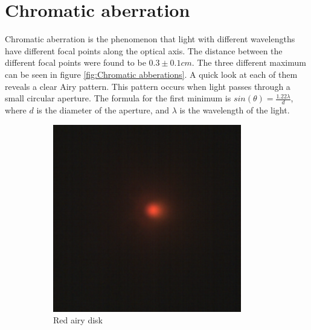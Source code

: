 \documentclass[a4paper,12pt]{article}
\begin{document}
\section{Chromatic aberration}
Chromatic aberration is the phenomenon that light with different wavelengths have different focal points along the optical axis.
The distance between the different focal points were found to be $0.3 \pm 0.1 cm$. The three different maximum can be seen in figure \ref{fig:Chromatic abberations}. A quick look at each of them reveals a clear Airy pattern. This pattern occurs when light passes through a small circular aperture. The formula for the first minimum is $sin(\theta) = \frac{1.22\lambda}{d}$, where $d$ is the diameter of the aperture, and $\lambda$ is the wavelength of the light. 
\begin{figure}[H]
        \centering
        \begin{subfigure}{0.3\textwidth}
                \includegraphics[width=\textwidth]{redfocus}
                \caption{Red airy disk}
                \label{fig:redfocus}
        \end{subfigure}
        \begin{subfigure}{0.3\textwidth}

\end{subfigure}
\end{figure}
\end{document}
